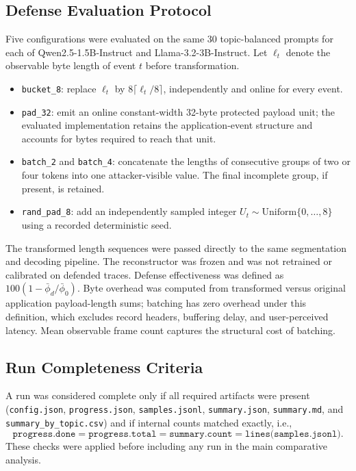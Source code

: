 \documentclass[journal,article,submit,pdftex,moreauthors]{Definitions/mdpi}
\begin{document}
\subsection{Defense Evaluation Protocol}
Five configurations were evaluated on the same 30 topic-balanced prompts for each of Qwen2.5-1.5B-Instruct and Llama-3.2-3B-Instruct. Let $\ell_t$ denote the observable byte length of event $t$ before transformation.
\begin{itemize}[leftmargin=2em]
    \item \texttt{bucket\_8}: replace $\ell_t$ by $8\lceil \ell_t/8\rceil$, independently and online for every event.
    \item \texttt{pad\_32}: emit an online constant-width 32-byte protected payload unit; the evaluated implementation retains the application-event structure and accounts for bytes required to reach that unit.
    \item \texttt{batch\_2} and \texttt{batch\_4}: concatenate the lengths of consecutive groups of two or four tokens into one attacker-visible value. The final incomplete group, if present, is retained.
    \item \texttt{rand\_pad\_8}: add an independently sampled integer $U_t\sim\mathrm{Uniform}\{0,\ldots,8\}$ using a recorded deterministic seed.
\end{itemize}
The transformed length sequences were passed directly to the same segmentation and decoding pipeline. The reconstructor was frozen and was not retrained or calibrated on defended traces. Defense effectiveness was defined as $100(1-\bar\phi_d/\bar\phi_0)$. Byte overhead was computed from transformed versus original application payload-length sums; batching has zero overhead under this definition, which excludes record headers, buffering delay, and user-perceived latency. Mean observable frame count captures the structural cost of batching.

\subsection{Run Completeness Criteria}
A run was considered complete only if all required artifacts were present (\texttt{config.json}, \texttt{progress.json}, \texttt{samples.jsonl}, \texttt{summary.json}, \texttt{summary.md}, and \texttt{summary\_by\_topic.csv}) and if internal counts matched exactly, i.e.,
\begin{equation}
\texttt{progress.done} = \texttt{progress.total} = \texttt{summary.count} = \texttt{lines(samples.jsonl)}.
\end{equation}
These checks were applied before including any run in the main comparative analysis.
\end{document}
